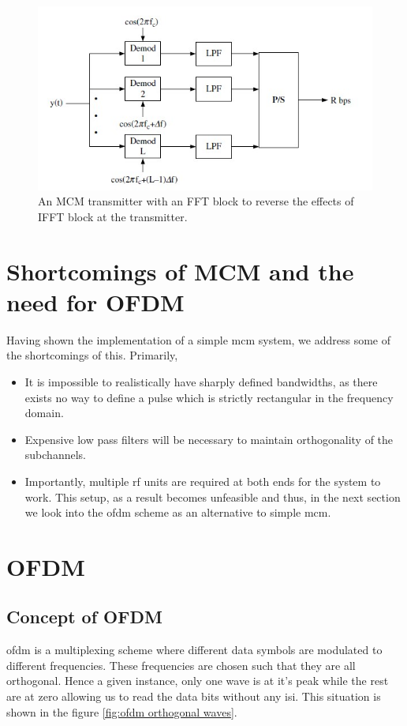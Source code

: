 \begin{figure}[!htbp]
\centering
\includegraphics[scale=1]{Chapter 2/Figures/MCM Receiver}
\caption[MCM Receiver]{An MCM transmitter with an FFT block to reverse the effects of IFFT block at the transmitter.}
\label{fig:mcm receiver}
\end{figure}




\section{Shortcomings of MCM and the need for OFDM}
Having shown the implementation of a simple \acrshort{mcm} system, we address some of the shortcomings of this. Primarily,
\begin{itemize}
\item It is impossible to realistically have sharply defined bandwidths, as there exists no way to define a pulse which is strictly rectangular in the frequency domain.
\item Expensive low pass filters will be necessary to maintain orthogonality of the subchannels.
\item Importantly, multiple \acrshort{rf} units are required at both ends for the system to work. This setup, as a result becomes unfeasible and thus, in the next section we look into the \acrshort{ofdm} scheme as an alternative to simple \acrshort{mcm}.
\end{itemize}

\section{OFDM}
\subsection{Concept of OFDM}
\acrlong{ofdm} is a multiplexing scheme where different data symbols are modulated to different frequencies. These frequencies are chosen such that they are all orthogonal. Hence a given instance, only one wave is at it's peak while the rest are at zero allowing us to read the data bits without any \acrlong{isi}. This situation is shown in the figure \ref{fig:ofdm orthogonal waves}.\\

